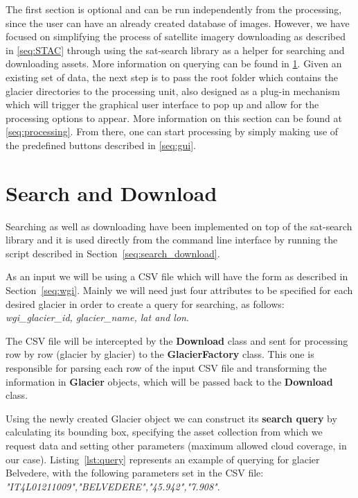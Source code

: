\documentclass[12pt, a4paper]{report}
\begin{document}
	\par The first section is optional and can be run independently from the processing, since the user can have an already created database of images. However, we have focused on simplifying the process of satellite imagery downloading as described in \ref{seq:STAC} through using the sat-search library as a helper for searching and downloading assets. More information on querying can be found in \ref{seq:sd_implementation}. 
	Given an existing set of data, the next step is to pass the root folder which contains the glacier directories to the processing unit, also designed as a plug-in mechanism which will trigger the graphical user interface to pop up and allow for the processing options to appear. More information on this section can be found at \ref{seq:processing}. From there, one can start processing by simply making use of the predefined buttons described in \ref{seq:gui}.
	
		
	\section{Search and Download}
	\label{seq:sd_implementation}
		
	\par Searching as well as downloading have been implemented on top of the sat-search library and it is used directly from the command line interface by running the script described in Section~\ref{seq:search_download}.
	
	\par As an input we will be using a CSV file which will have the form as described in Section~\ref{seq:wgi}. Mainly we will need just four attributes to be specified for each desired glacier in order to create a query for searching, as follows: \textit{wgi\_glacier\_id, glacier\_name, lat and lon}.
	
	\par The CSV file will be intercepted by the \textbf{Download } class and sent for processing row by row (glacier by glacier) to the \textbf{GlacierFactory} class. This one is responsible for parsing each row of the input CSV file and transforming the information in \textbf{Glacier} objects, which will be passed back to the \textbf{Download} class.
	
	\par Using the newly created Glacier object we can construct its \textbf{search query} by calculating its bounding box, specifying the asset collection from which we request data and setting other parameters (maximum allowed cloud coverage, in our case). Listing~\ref{lst:query} represents an example of querying for glacier Belvedere, with the following parameters set in the CSV file: \textit{"IT4L01211009","BELVEDERE","45.942","7.908"}.
	
\end{document}
